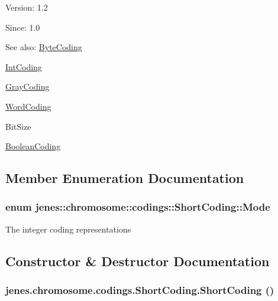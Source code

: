 \begin{Desc}
\item[Version:]1.2 \end{Desc}
\begin{Desc}
\item[Since:]1.0\end{Desc}
\begin{Desc}
\item[See also:]\hyperlink{classjenes_1_1chromosome_1_1codings_1_1_byte_coding}{ByteCoding} 

\hyperlink{classjenes_1_1chromosome_1_1codings_1_1_int_coding}{IntCoding} 

\hyperlink{classjenes_1_1chromosome_1_1codings_1_1_gray_coding}{GrayCoding} 

\hyperlink{classjenes_1_1chromosome_1_1codings_1_1_word_coding}{WordCoding} 

BitSize 

\hyperlink{classjenes_1_1chromosome_1_1codings_1_1_boolean_coding}{BooleanCoding} \end{Desc}


\subsection{Member Enumeration Documentation}
\hypertarget{classjenes_1_1chromosome_1_1codings_1_1_short_coding_a38532b0120f3d7d1a77538e16ca7e5f}{
\subsubsection[Mode]{\setlength{\rightskip}{0pt plus 5cm}enum {\bf jenes::chromosome::codings::ShortCoding::Mode}}}
\label{classjenes_1_1chromosome_1_1codings_1_1_short_coding_a38532b0120f3d7d1a77538e16ca7e5f}


The integer coding representations 

\subsection{Constructor \& Destructor Documentation}
\hypertarget{classjenes_1_1chromosome_1_1codings_1_1_short_coding_0571cd23357dd77c1525ed09a5c28e61}{
\subsubsection[ShortCoding]{\setlength{\rightskip}{0pt plus 5cm}jenes.chromosome.codings.ShortCoding.ShortCoding ()}}
\label{classjenes_1_1chromosome_1_1codings_1_1_short_coding_0571cd23357dd77c1525ed09a5c28e61}


